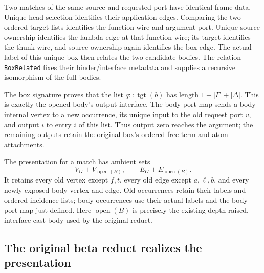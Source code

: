 
Two matches of the same source and requested port have identical frame data.
Unique head selection identifies their application edges. Comparing the two
ordered target lists identifies the function wire and argument port. Unique
source ownership identifies the lambda edge at that function wire; its target
identifies the thunk wire, and source ownership again identifies the box edge.
The actual label of this unique box then relates the two candidate bodies.
The relation \texttt{BoxRelated} fixes their binder/interface metadata and
supplies a recursive isomorphism of the full bodies.



The box signature proves that the list $q::\operatorname{tgt}(b)$ has length
$1+|\Gamma|+|\Delta|$. This is exactly the opened body's output interface.
The body-port map sends a body internal vertex to a new occurrence, its unique
input to the old request port $v$, and output $i$ to entry $i$ of this list.
Thus output zero reaches the argument; the remaining outputs retain the
original box's ordered free term and atom attachments.



The presentation for a match has ambient sets
\[
V_G+V_{\operatorname{open}(B)},\qquad E_G+E_{\operatorname{open}(B)}.
\]
It retains every old vertex except $f,t$, every old edge except $a,\ell,b$,
and every newly exposed body vertex and edge. Old occurrences retain their
labels and ordered incidence lists; body occurrences use their actual labels
and the body-port map just defined. Here $\operatorname{open}(B)$ is precisely
the existing depth-raised, interface-cast body used by the original reduct.


\subsection{The original beta reduct realizes the presentation}

